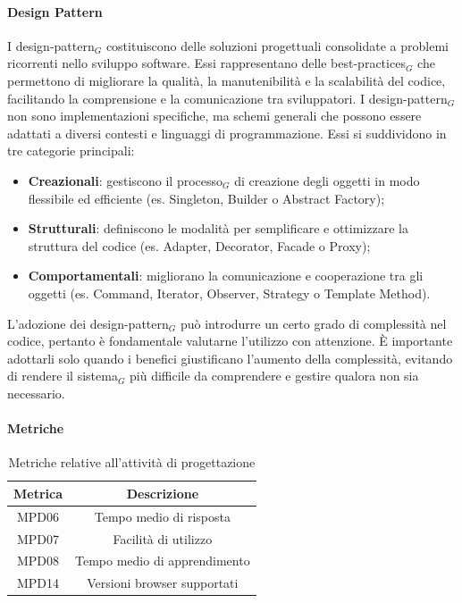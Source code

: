 \documentclass[10pt]{article}
\begin{document}
\begin{justify}
        \paragraph{Design Pattern}
        I design-pattern$_G$ costituiscono delle soluzioni progettuali consolidate a problemi ricorrenti nello sviluppo software. Essi rappresentano delle best-practices$_G$ che permettono di migliorare la qualità, la manutenibilità e la scalabilità del codice, facilitando la comprensione e la comunicazione tra sviluppatori. I design-pattern$_G$ non sono implementazioni specifiche, ma schemi generali che possono essere adattati a diversi contesti e linguaggi di programmazione. Essi si suddividono in tre categorie principali:
        \begin{itemize}
            \item \textbf{Creazionali}: gestiscono il processo$_G$ di creazione degli oggetti in modo flessibile ed efficiente (es. Singleton, Builder o Abstract Factory);
            \item \textbf{Strutturali}: definiscono le modalità per semplificare e ottimizzare la struttura del codice (es. Adapter, Decorator, Facade o Proxy);
            \item \textbf{Comportamentali}: migliorano la comunicazione e cooperazione tra gli oggetti (es. Command, Iterator, Observer, Strategy o Template Method).
        \end{itemize}
        L'adozione dei design-pattern$_G$ può introdurre un certo grado di complessità nel codice, pertanto è fondamentale valutarne l'utilizzo con attenzione. È importante adottarli solo quando i benefici giustificano l'aumento della complessità, evitando di rendere il sistema$_G$ più difficile da comprendere e gestire qualora non sia necessario.

        \paragraph{Metriche}
        \begin{table}[H]
          \centering
          \begin{tabular}{|c|c|}
            \hline
            \textbf{Metrica} & \textbf{Descrizione} \\
            \hline
            MPD06 & Tempo medio di risposta\\
            \hline
            MPD07 & Facilità di utilizzo\\
            \hline
            MPD08 & Tempo medio di apprendimento\\
            \hline
            MPD14 & Versioni browser supportati\\
            \hline
          \end{tabular}
          \caption{Metriche relative all'attività di progettazione}
        \end{table}


\end{justify}
\end{document}
